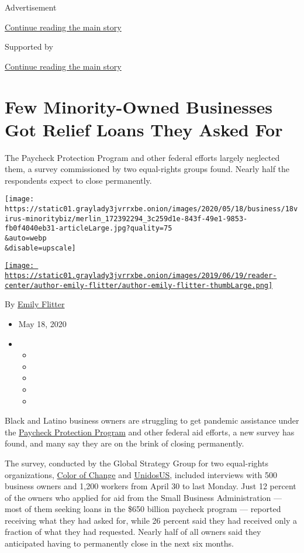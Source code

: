 Advertisement

\protect\hyperlink{after-top}{Continue reading the main story}

Supported by

\protect\hyperlink{after-sponsor}{Continue reading the main story}

\hypertarget{few-minority-owned-businesses-got-relief-loans-they-asked-for}{%
\section{Few Minority-Owned Businesses Got Relief Loans They Asked
For}\label{few-minority-owned-businesses-got-relief-loans-they-asked-for}}

The Paycheck Protection Program and other federal efforts largely
neglected them, a survey commissioned by two equal-rights groups found.
Nearly half the respondents expect to close permanently.

\texttt{[image: https://static01.graylady3jvrrxbe.onion/images/2020/05/18/business/18virus-minoritybiz/merlin\_172392294\_3c259d1e-843f-49e1-9853-fb0f4040eb31-articleLarge.jpg?quality=75\\\&auto=webp\\\&disable=upscale]}

\href{https://www.nytimes3xbfgragh.onion/by/emily-flitter}{\texttt{[image: https://static01.graylady3jvrrxbe.onion/images/2019/06/19/reader-center/author-emily-flitter/author-emily-flitter-thumbLarge.png]}}

By \href{https://www.nytimes3xbfgragh.onion/by/emily-flitter}{Emily
Flitter}

\begin{itemize}
\item
  May 18, 2020
\item
  \begin{itemize}
  \item
  \item
  \item
  \item
  \item
  \end{itemize}
\end{itemize}

Black and Latino business owners are struggling to get pandemic
assistance under the
\href{https://www.nytimes3xbfgragh.onion/2020/06/10/business/Small-business-loans-ppp.html}{Paycheck
Protection Program} and other federal aid efforts, a new survey has
found, and many say they are on the brink of closing permanently.

The survey, conducted by the Global Strategy Group for two equal-rights
organizations, \href{https://colorofchange.org/}{Color of Change} and
\href{https://www.unidosus.org/}{UnidosUS}, included interviews with 500
business owners and 1,200 workers from April 30 to last Monday. Just 12
percent of the owners who applied for aid from the Small Business
Administration --- most of them seeking loans in the \$650 billion
paycheck program --- reported receiving what they had asked for, while
26 percent said they had received only a fraction of what they had
requested. Nearly half of all owners said they anticipated having to
permanently close in the next six months.

